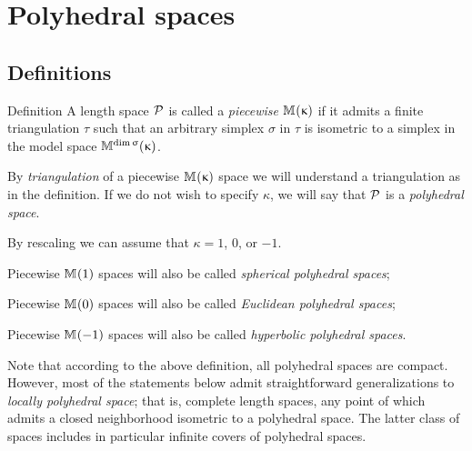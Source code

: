 \chapter{Polyhedral spaces}\label{chapter:polyhedral}

\section{Definitions}

\begin{thm}{Definition}\label{def:poly}
A length space $\mathcal{P}$ is called a
\emph{piecewise $\mathbb{M}_{{}}^{}({\upkappa})$} 
if it admits a finite triangulation $\tau$ 
such that an arbitrary simplex $\sigma$ in $\tau$ is isometric to a simplex in the model space $\mathbb{M}_{{}}^{\mathop{\rm dim}\nolimits \upsigma}({\upkappa})$.

By \emph{triangulation} of a piecewise
$\mathbb{M}_{{}}^{}({\upkappa})$ space 
we will understand a triangulation as in the definition.
If we do not wish to specify $\kappa$, we will say that $\mathcal{P}$ is a \emph{polyhedral space}. 

By rescaling we can assume that $\kappa=1$, $0$, or $-1$.
\begin{subthm}{}
Piecewise $\mathbb{M}_{{}}^{}({1})$ spaces will also be 
called 
\emph{spherical polyhedral spaces};
\end{subthm}

\begin{subthm}{}
Piecewise $\mathbb{M}_{{}}^{}({0})$ spaces will also be 
called 
\emph{Euclidean polyhedral spaces};
\end{subthm}

\begin{subthm}{}
Piecewise  $\mathbb{M}_{{}}^{}({-1})$ spaces will also be 
called 
\emph{hyperbolic polyhedral spaces}.
\end{subthm}
\end{thm}

Note that according to the above definition,
all polyhedral spaces are compact.
However, 
most of the statements below admit straightforward generalizations 
to \emph{locally polyhedral space};
that is, complete length spaces,  
any point of which admits a closed neighborhood isometric to a polyhedral space.
The latter class of spaces includes in particular  infinite covers of polyhedral spaces.

